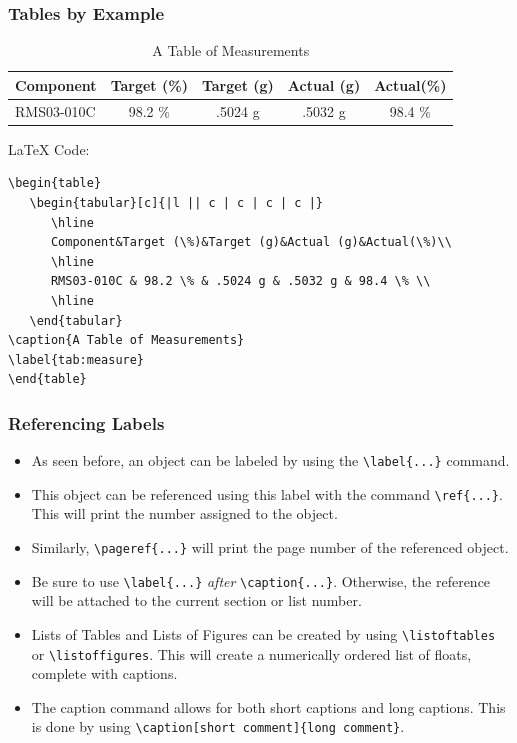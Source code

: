\documentclass{beamer}
\begin{document}
\begin{frame}[containsverbatim]
    \frametitle{Tables by Example}
    \begin{table}
        \begin{tabular}[c]{|l || c | c | c | c |}
            \hline
                Component & Target (\%) & Target (g) & Actual (g) & Actual(\%) \\
            \hline
                RMS03-010C & 98.2 \% & .5024 g & .5032 g & 98.4 \% \\
            \hline
        \end{tabular}
        \label{tab:measure}
        \caption{A Table of Measurements}
        \vspace{-15pt}
    \end{table}

    \begin{block}{\LaTeX{ }Code:} \footnotesize
    \begin{verbatim}
\begin{table}
   \begin{tabular}[c]{|l || c | c | c | c |}
      \hline
      Component&Target (\%)&Target (g)&Actual (g)&Actual(\%)\\
      \hline
      RMS03-010C & 98.2 \% & .5024 g & .5032 g & 98.4 \% \\
      \hline
   \end{tabular}
\caption{A Table of Measurements}
\label{tab:measure}
\end{table}
    \end{verbatim}
    \end{block} 
\end{frame}

\begin{frame}[containsverbatim]
    \frametitle{Referencing Labels}
    \begin{itemize}
    \item As seen before, an object can be labeled by using the \verb|\label{...}| command. 
    \item This object can be referenced using this label with the command \verb|\ref{...}|. This will print the number assigned to the object.
    \item Similarly, \verb|\pageref{...}| will print the page number of the referenced object.
    \item Be sure to use \verb|\label{...}| \emph{after} \verb|\caption{...}|. Otherwise, the reference will be attached to the current section or list number.
    \item Lists of Tables and Lists of Figures can be created by using \verb|\listoftables| or \verb|\listoffigures|. This will create a numerically ordered list of floats, complete with captions.
    \item The caption command allows for both short captions and long captions. This is done by using \verb|\caption[short comment]{long comment}|.
    \end{itemize}
\end{frame}
\end{document}

